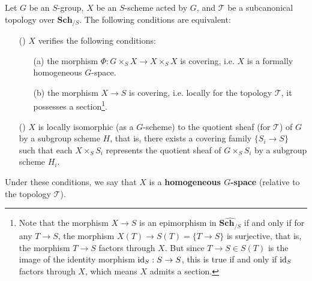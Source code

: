 \begin{proposition}\label{scheme formally homogeneous iff}
Let $G$ be an $S$-group, $X$ be an $S$-scheme acted by $G$, and $\mathcal{T}$ be a subcanonical topology over $\mathbf{Sch}_{/S}$. The following conditions are equivalent:
\begin{enumerate}
    \item[(\rmnum{1})] $X$ verifies the following conditions:
    \begin{enumerate}
        \item[(a)] the morphism $\Phi:G\times_SX\to X\times_SX$ is covering, i.e. $X$ is a formally homogeneous $G$-space.
        \item[(b)] the morphism $X\to S$ is covering, i.e. locally for the topology $\mathcal{T}$, it possesses a section\footnote{Note that the morphism $X\to S$ is an epimorphism in $\widehat{\mathbf{Sch}_{/S}}$ if and only if for any $T\to S$, the morphism $X(T)\to S(T)=\{T\to S\}$ is surjective, that is, the morphism $T\to S$ factors through $X$. But since $T\to S\in S(T)$ is the image of the identity morphism $\operatorname{id}_S:S\to S$, this is true if and only if $\operatorname{id}_S$ factors through $X$, which means $X$ admits a section.}.
    \end{enumerate}
    \item[(\rmnum{2})] $X$ is locally isomorphic (as a $G$-scheme) to the quotient sheaf (for $\mathcal{T}$) of $G$ by a subgroup scheme $H$, that is, there exists a covering family $\{S_i\to S\}$ such that each $X\times_SS_i$ represents the quotient sheaf of $G\times_SS_i$ by a subgroup scheme $H_i$.
\end{enumerate}
Under these conditions, we say that $X$ is a \textbf{homogeneous $G$-space} (relative to the topology $\mathcal{T}$).
\end{proposition}
